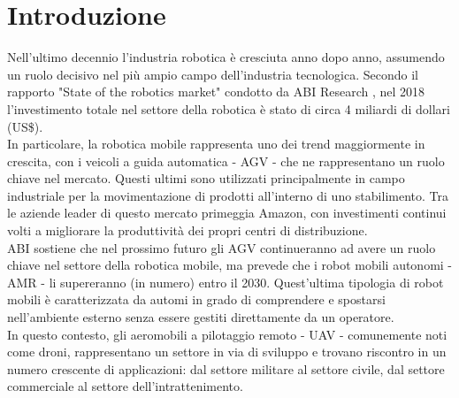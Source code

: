 
\chapter{Introduzione}\label{ch:intro}
Nell'ultimo decennio l'industria robotica è cresciuta anno dopo anno, assumendo un ruolo decisivo nel più ampio campo dell'industria tecnologica. Secondo il rapporto "State of the robotics market" condotto da ABI Research \cite{ABI}, nel 2018 l'investimento totale nel settore della robotica è stato di circa 4 miliardi di dollari (US\$).\\

In particolare, la robotica mobile rappresenta uno dei trend maggiormente in crescita, con i veicoli a guida automatica - \ac{AGV} - che ne rappresentano un ruolo chiave nel mercato. Questi ultimi sono utilizzati principalmente in campo industriale per la movimentazione di prodotti all'interno di uno stabilimento. Tra le aziende leader di questo mercato primeggia Amazon, con investimenti continui volti a migliorare la produttività dei propri centri di distribuzione.\\

ABI sostiene che nel prossimo futuro gli \acs{AGV} continueranno ad avere un ruolo chiave nel settore della robotica mobile, ma prevede che i robot mobili autonomi - \ac{AMR} - li supereranno (in numero) entro il 2030. Quest'ultima tipologia di robot mobili è caratterizzata da automi in grado di comprendere e spostarsi nell'ambiente esterno senza essere gestiti direttamente da un operatore.\\

In questo contesto, gli aeromobili a pilotaggio remoto - \ac{UAV} - comunemente noti come droni, rappresentano un settore in via di sviluppo e trovano riscontro in un numero crescente di applicazioni: dal settore militare al settore civile, dal settore commerciale al settore dell'intrattenimento.


